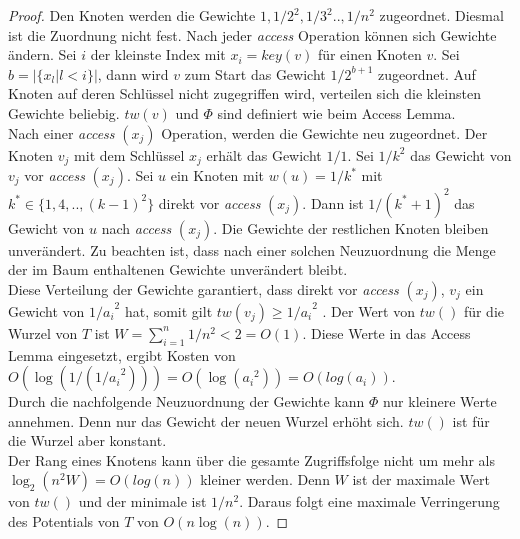 \documentclass[a4paper,12pt]{article}
\begin{document}
\begin{proof}
	Den Knoten werden die Gewichte $1, 1/2^2,1/3^2 .., 1/n^2$ zugeordnet. Diesmal ist die Zuordnung nicht fest. Nach jeder \textit{access} Operation können sich Gewichte ändern. Sei $i$ der kleinste Index mit $x_i = \mathit{key}\left(v\right)$ für einen Knoten $v$. Sei $b = \vert\{x_l \vert l < i\}\vert$, dann wird $v$ zum Start das Gewicht $1 / 2^{b+1}$ zugeordnet. Auf Knoten auf deren Schlüssel nicht zugegriffen wird, verteilen sich die kleinsten Gewichte beliebig. $\mathit{tw}\left(v\right)$ und $\Phi$ sind definiert wie beim Access Lemma.\\
	Nach einer \textit{access} $\left(x_j\right)$ Operation, werden die Gewichte neu zugeordnet. Der Knoten $v_j$ mit dem Schlüssel $x_j$ erhält das Gewicht $1/1$. Sei $1/k^2$ das Gewicht von $v_j$ vor \textit{access} $\left(x_j\right)$. Sei $u$ ein Knoten mit $w\left(u\right) = 1 / k^*$ mit \\ $k^* \in \{1, 4,.., \left(k-1\right)^2\}$ direkt vor \textit{access} $\left(x_j\right)$. Dann ist $1 /\left(k^* + 1\right)^2$ das Gewicht von $u$ nach \textit{access} $\left(x_j\right)$. Die Gewichte der restlichen Knoten bleiben unverändert. Zu beachten ist, dass nach einer solchen Neuzuordnung die Menge der im Baum enthaltenen Gewichte unverändert bleibt. \\
	Diese Verteilung der Gewichte garantiert, dass direkt vor  \textit{access} $\left(x_j\right)$, $v_j$ ein Gewicht von ${1 /a_i}^2$ hat, somit gilt $\mathit{tw}\left(v_j\right) \geq {1 /a_i}^2$ . Der Wert von $\mathit{tw}\left(\right)$ für die Wurzel von $T$ ist $W = \sum_{i = 1}^{n} 1/ n^2 < 2 = O\left(1\right) $. Diese Werte in das Access Lemma eingesetzt, ergibt Kosten von \\ $O\left(\log\left(1 / \left({1 /a_i}^2\right)\right)\right) = O\left(\log\left({a_i}^2 \right)\right) = O\left(log\left(a_i\right)\right)$.\\
	 Durch die nachfolgende Neuzuordnung der Gewichte kann $\Phi$ nur kleinere Werte annehmen. Denn nur das Gewicht der neuen Wurzel erhöht sich. $\mathit{tw}\left(\right)$ ist für die Wurzel aber konstant.\\
	Der Rang eines Knotens kann über die gesamte Zugriffsfolge nicht um mehr als $\log_2\left(n^2 W\right) = O\left(log\left(n\right)\right)$ kleiner werden. Denn $W$ ist der maximale Wert von $\mathit{tw}\left(\right)$ und  der minimale ist $1 /n^2$. Daraus folgt eine maximale Verringerung des Potentials von $T$ von $O\left(n \log \left(n\right)\right)$. 
\end{proof}
\end{document}
